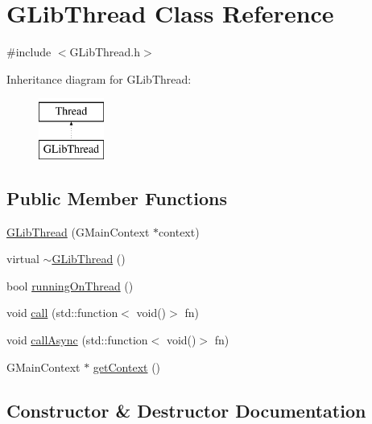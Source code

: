 \hypertarget{classGLibThread}{}\section{G\+Lib\+Thread Class Reference}
\label{classGLibThread}


{\ttfamily \#include $<$G\+Lib\+Thread.\+h$>$}

Inheritance diagram for G\+Lib\+Thread\+:\begin{figure}[H]
\begin{center}
\leavevmode
\includegraphics[height=2.000000cm]{classGLibThread}
\end{center}
\end{figure}
\subsection*{Public Member Functions}
\begin{DoxyCompactItemize}
\item 
\mbox{\hyperlink{classGLibThread_a22d8cefcf9ab16388737139d8eaecbf1}{G\+Lib\+Thread}} (G\+Main\+Context $\ast$context)
\item 
virtual \mbox{\hyperlink{classGLibThread_a8d47d4b4e6989548340a8f018d648e54}{$\sim$\+G\+Lib\+Thread}} ()
\item 
bool \mbox{\hyperlink{classGLibThread_a48e06a164ff2bb673d115fad34706cbd}{running\+On\+Thread}} ()
\item 
void \mbox{\hyperlink{classGLibThread_a32b38c6db21cb4f86b6840acf0cda1b4}{call}} (std\+::function$<$ void()$>$ fn)
\item 
void \mbox{\hyperlink{classGLibThread_aa31afcc7fc630ad32aab01852f3d2e9a}{call\+Async}} (std\+::function$<$ void()$>$ fn)
\item 
G\+Main\+Context $\ast$ \mbox{\hyperlink{classGLibThread_a27a5c316c4b927d48534d023fe4c4029}{get\+Context}} ()
\end{DoxyCompactItemize}


\subsection{Constructor \& Destructor Documentation}
\mbox{\label{classGLibThread_a22d8cefcf9ab16388737139d8eaecbf1}} 
